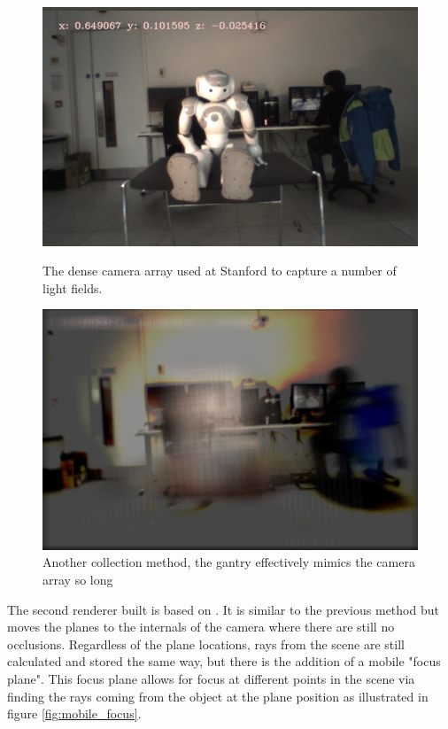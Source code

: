 \documentclass[12pt]{report}
\begin{document}
\begin{figure}[!ht]
	\centering
	\begin{minipage}{0.45\textwidth}
		\centering
		\includegraphics[scale=0.30]{nau_occluding.png}
		\caption{The dense camera array used at Stanford to capture a number of light fields.}
		\label{fig:nau_occluding}
	\end{minipage}\hfill
	\begin{minipage}{0.45\textwidth}
		\centering
		\includegraphics[scale=0.30]{seethrough_nau.png}
		\caption{Another collection method, the gantry effectively mimics the camera array so long}
		\label{fig:seethrough_nau}
	\end{minipage}
\end{figure}
The second renderer built is based on \cite{Isaksen01}. It is similar to the previous method but moves the planes to the internals of the camera where there are still no occlusions. Regardless of the plane locations, rays from the scene are still calculated and stored the same way, but there is the addition of a mobile "focus plane". This focus plane allows for focus at different points in the scene via finding the rays coming from the object at the plane position as illustrated in figure \ref{fig:mobile_focus}.
\end{document}
